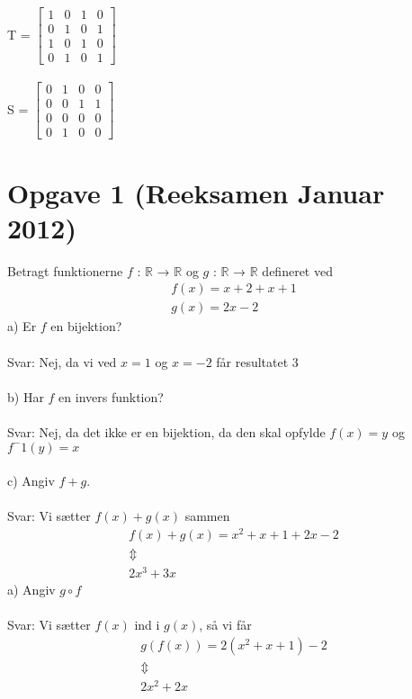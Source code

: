 \documentclass{article}
\begin{document}
\\
\newline
T =
\begin{math}
\begin{bmatrix}
1 & 0 & 1 & 0\\
0 & 1 & 0 & 1\\
1 & 0 & 1 & 0\\
0 & 1 & 0 & 1
\end{bmatrix}
\end{math}
\\
\\
\newline
S =
\begin{math}
\begin{bmatrix}
0 & 1 & 0 & 0\\
0 & 0 & 1 & 1\\
0 & 0 & 0 & 0\\
0 & 1 & 0 & 0
\end{bmatrix}
\end{math}

\section{Opgave 1 (Reeksamen Januar 2012)}
Betragt funktionerne $f$ : $\mathbb{R}$ → $\mathbb{R}$ og $g$ : $\mathbb{R}$ → $\mathbb{R}$ defineret ved
\\
\begin{align*}
f(x) = x +2 + x + 1
\\
g(x) = 2x - 2
\end{align*}
a) Er $f$ en bijektion?
\\
\\
Svar: Nej, da vi ved $x = 1$ og $x = -2$ får resultatet $3$
\\
\\
\newline
b) Har $f$ en invers funktion?
\\
\\
Svar: Nej, da det ikke er en bijektion, da den skal opfylde $f(x) = y$ og $f^-1(y) = x$
\\
\\
c) Angiv $f + g$.
\\
\\
Svar: Vi sætter  $f(x) + g(x)$ sammen
\\
\begin{align*}
f(x) + g(x) = x^2 + x +1 + 2x - 2
\\
\Updownarrow
\\
2x^3 + 3x
\end{align*}
a) Angiv $g \circ f$
\\
\\
Svar:
Vi sætter $f(x)$ ind i $g(x)$, så vi får
\begin{align*}
g(f(x)) = 2(x^2 + x + 1)-2
\\
\Updownarrow
\\
2x^2 + 2x
\end{align*}
\end{document}
